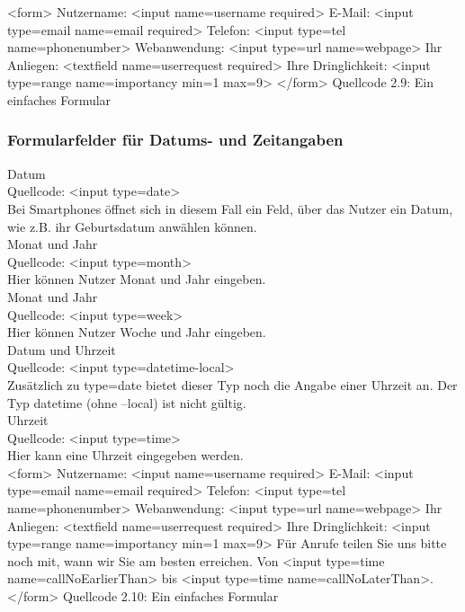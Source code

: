 <form>
Nutzername: <input name=username required>
E-Mail: <input type=email name=email required>
Telefon: <input type=tel name=phonenumber>
Webanwendung: <input type=url name=webpage>
Ihr Anliegen: <textfield name=userrequest required>
Ihre Dringlichkeit: <input type=range name=importancy min=1 max=9>
</form>
Quellcode 2.9: Ein einfaches Formular

\subsubsection{Formularfelder für Datums- und Zeitangaben}

Datum\\

Quellcode: <input type=date>\\

Bei Smartphones öffnet sich in diesem Fall ein Feld, über das Nutzer ein Datum, wie z.B. ihr Geburtsdatum anwählen können.\\

Monat und Jahr\\

Quellcode: <input type=month>\\

Hier können Nutzer Monat und Jahr eingeben.\\

Monat und Jahr\\

Quellcode: <input type=week>\\

Hier können Nutzer Woche und Jahr eingeben.\\

Datum und Uhrzeit\\

Quellcode: <input type=datetime-local>\\

Zusätzlich zu type=date bietet dieser Typ noch die Angabe einer Uhrzeit an. Der Typ datetime (ohne –local) ist nicht gültig.\\

Uhrzeit\\

Quellcode: <input type=time>\\

Hier kann eine Uhrzeit eingegeben werden.\\

<form>
Nutzername: <input name=username required>
E-Mail: <input type=email name=email required>
Telefon: <input type=tel name=phonenumber>
Webanwendung: <input type=url name=webpage>
Ihr Anliegen: <textfield name=userrequest required>
Ihre Dringlichkeit: <input type=range name=importancy min=1 max=9>
Für Anrufe teilen Sie uns bitte noch mit, wann wir Sie am besten erreichen. Von <input type=time name=callNoEarlierThan> bis <input type=time name=callNoLaterThan>.
</form>
Quellcode 2.10: Ein einfaches Formular

